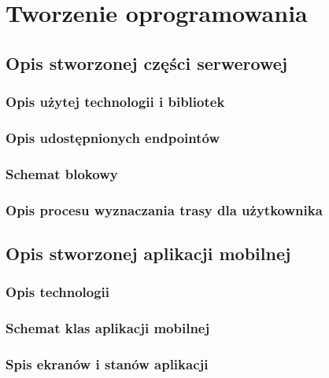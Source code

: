 \chapter{Tworzenie oprogramowania}
\label{cha:tworzenie_oprogramowania}

\section{Opis stworzonej części serwerowej}



\subsection{Opis użytej technologii i bibliotek}



\subsection{Opis udostępnionych endpointów}



\subsection{Schemat blokowy}



\subsection{Opis procesu wyznaczania trasy dla użytkownika}



\section{Opis stworzonej aplikacji mobilnej}



\subsection{Opis technologii}



\subsection{Schemat klas aplikacji mobilnej}



\subsection{Spis ekranów i stanów aplikacji}



